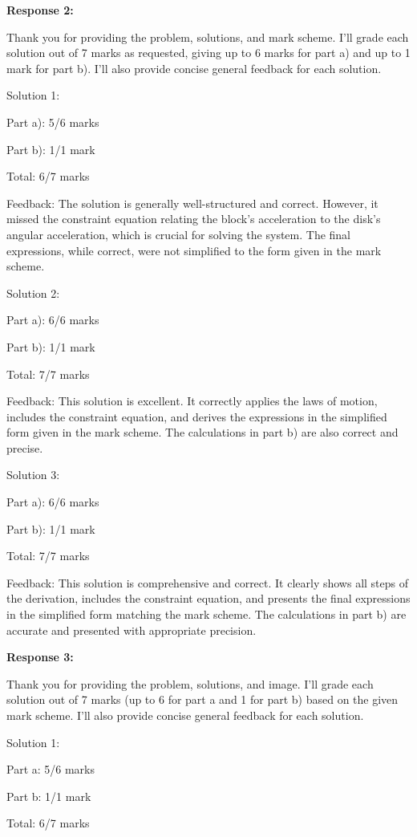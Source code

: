 \documentclass[a4paper,11pt]{article}
\begin{document}
\bigskip
\textbf{Response 2:}

Thank you for providing the problem, solutions, and mark scheme. I'll grade each solution out of 7 marks as requested, giving up to 6 marks for part a) and up to 1 mark for part b). I'll also provide concise general feedback for each solution.

Solution 1:

Part a): 5/6 marks

Part b): 1/1 mark

Total: 6/7 marks

Feedback: The solution is generally well-structured and correct. However, it missed the constraint equation relating the block's acceleration to the disk's angular acceleration, which is crucial for solving the system. The final expressions, while correct, were not simplified to the form given in the mark scheme.

Solution 2:

Part a): 6/6 marks

Part b): 1/1 mark

Total: 7/7 marks

Feedback: This solution is excellent. It correctly applies the laws of motion, includes the constraint equation, and derives the expressions in the simplified form given in the mark scheme. The calculations in part b) are also correct and precise.

Solution 3:

Part a): 6/6 marks

Part b): 1/1 mark

Total: 7/7 marks

Feedback: This solution is comprehensive and correct. It clearly shows all steps of the derivation, includes the constraint equation, and presents the final expressions in the simplified form matching the mark scheme. The calculations in part b) are accurate and presented with appropriate precision.

\bigskip
\textbf{Response 3:}

Thank you for providing the problem, solutions, and image. I'll grade each solution out of 7 marks (up to 6 for part a and 1 for part b) based on the given mark scheme. I'll also provide concise general feedback for each solution.

Solution 1:

Part a: 5/6 marks

Part b: 1/1 mark

Total: 6/7 marks
\end{document}
